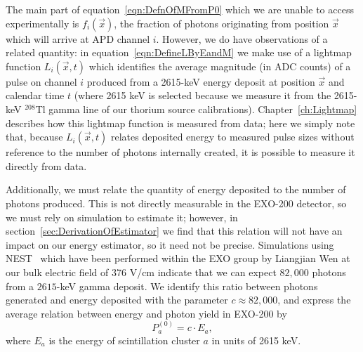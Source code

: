The main part of equation~\ref{eqn:DefnOfMFromP0} which we are unable to access experimentally is $f_i(\vec{x})$, the fraction of photons originating from position $\vec{x}$ which will arrive at APD channel $i$.  However, we do have observations of a related quantity: in equation~\ref{eqn:DefineLByEandM} we make use of a lightmap function $L_i(\vec{x}, t)$ which identifies the average magnitude (in ADC counts) of a pulse on channel $i$ produced from a 2615-keV energy deposit at position $\vec{x}$ and calendar time $t$ (where 2615 keV is selected because we measure it from the 2615-keV $^{208}$Tl gamma line of our thorium source calibrations).  Chapter~\ref{ch:Lightmap} describes how this lightmap function is measured from data; here we simply note that, because $L_i(\vec{x}, t)$ relates deposited energy to measured pulse sizes without reference to the number of photons internally created, it is possible to measure it directly from data.

Additionally, we must relate the quantity of energy deposited to the number of photons produced.  This is not directly measurable in the EXO-200 detector, so we must rely on simulation to estimate it; however, in section~\ref{sec:DerivationOfEstimator} we find that this relation will not have an impact on our energy estimator, so it need not be precise.  Simulations using NEST~\cite{NESTpaper} which have been performed within the EXO group by Liangjian Wen at our bulk electric field of 376 V/cm indicate that we can expect $82,000$ photons from a $2615$-keV gamma deposit.  We identify this ratio between photons generated and energy deposited with the parameter $c \approx 82,000$, and express the average relation between energy and photon yield in EXO-200 by
\begin{equation} \label{eqn:DefnOfP0}
P^{(0)}_a = c \cdot E_a,
\end{equation}
where $E_a$ is the energy of scintillation cluster $a$ in units of 2615 keV.

